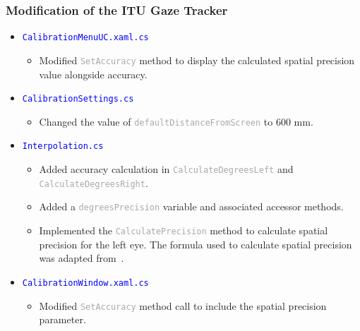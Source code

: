 \documentclass{beamer}
\begin{document}
    \begin{frame}
        \frametitle{Modification of the ITU Gaze Tracker}

        \begin{itemize}
            \item \texttt{\textcolor{blue}{CalibrationMenuUC.xaml.cs}} \\
                \begin{itemize}
                    \item Modified \texttt{\textcolor{darkgray}{SetAccuracy}}
                    method to display the calculated spatial precision value
                    alongside accuracy.
                \end{itemize}

            \item \texttt{\textcolor{blue}{CalibrationSettings.cs}}
                \begin{itemize}
                    \item Changed the value of
                    \texttt{\textcolor{darkgray}{defaultDistanceFromScreen}} to 600 mm.
                \end{itemize}

            \item \texttt{\textcolor{blue}{Interpolation.cs}}
                \begin{itemize}
                    \item Added accuracy calculation in
                    \texttt{\textcolor{darkgray}{CalculateDegreesLeft}} and
                    \texttt{\textcolor{darkgray}{CalculateDegreesRight}}.

                    \item Added a \texttt{\textcolor{darkgray}{degreesPrecision}}
                    variable and associated accessor methods.

                    \item Implemented the \texttt{\textcolor{darkgray}{CalculatePrecision}}
                    method to calculate spatial precision for the left eye.
                    The formula used to calculate spatial precision was adapted
                    from~\cite{Ho}.
                \end{itemize}

            \item \texttt{\textcolor{blue}{CalibrationWindow.xaml.cs}}
                \begin{itemize}
                    \item Modified \texttt{\textcolor{darkgray}{SetAccuracy}}
                    method call to include the spatial precision parameter.
                \end{itemize}

        \end{itemize}

    \end{frame}
\end{document}
